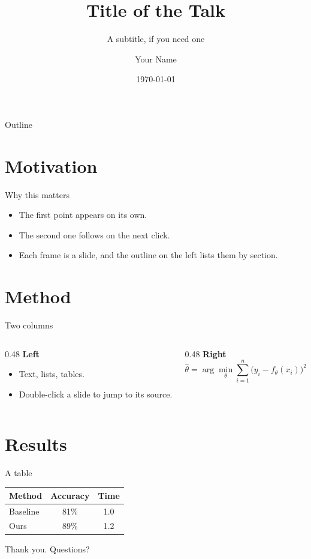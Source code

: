 \documentclass[aspectratio=169,11pt]{beamer}
\title{Title of the Talk}
\subtitle{A subtitle, if you need one}
\author{Your Name}
\institute{Your Institution}
\date{\today}
\begin{document}
\begin{frame}
  \titlepage
\end{frame}

\begin{frame}{Outline}
  \tableofcontents
\end{frame}

\section{Motivation}

\begin{frame}{Why this matters}
  \begin{itemize}
    \item<1-> The first point appears on its own.
    \item<2-> The second one follows on the next click.
    \item<3-> Each frame is a slide, and the outline on the left lists them by section.
  \end{itemize}
\end{frame}

\section{Method}

\begin{frame}{Two columns}
  \begin{columns}[T]
    \begin{column}{0.48\textwidth}
      \textbf{Left}
      \begin{itemize}
        \item Text, lists, tables.
        \item Double-click a slide to jump to its source.
      \end{itemize}
    \end{column}
    \begin{column}{0.48\textwidth}
      \textbf{Right}
      \begin{equation*}
        \hat{\theta} = \arg\min_{\theta} \sum_{i=1}^{n} \bigl(y_i - f_\theta(x_i)\bigr)^2
      \end{equation*}
    \end{column}
  \end{columns}
\end{frame}

\section{Results}

\begin{frame}{A table}
  \centering
  \begin{tabular}{lcc}
    \toprule
    Method & Accuracy & Time \\
    \midrule
    Baseline & 81\% & 1.0 \\
    Ours & \alert{89\%} & 1.2 \\
    \bottomrule
  \end{tabular}
\end{frame}

\begin{frame}
  \centering
  \Large Thank you. Questions?
\end{frame}
\end{document}
